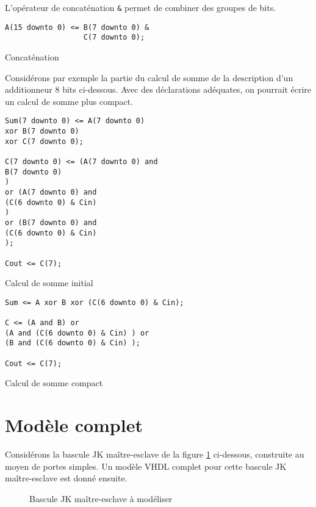 \documentclass[letter, oneside]{book}
\begin{document}
L'opérateur de concaténation \texttt{\&} permet de combiner des groupes de bits.

\begin{listing}[htbp]
\begin{verbatim}
A(15 downto 0) <= B(7 downto 0) &
                  C(7 downto 0);
\end{verbatim}
\caption{Concaténation}
\end{listing}

Considérons par exemple la partie du calcul de somme de la description
d'un additionneur 8 bits ci-dessous.  Avec des déclarations adéquates,
on pourrait écrire un calcul de somme plus compact.

\begin{listing}[htbp]
\begin{verbatim}
Sum(7 downto 0) <= A(7 downto 0)
xor B(7 downto 0)
xor C(7 downto 0);

C(7 downto 0) <= (A(7 downto 0) and
B(7 downto 0)
)
or (A(7 downto 0) and
(C(6 downto 0) & Cin)
)
or (B(7 downto 0) and
(C(6 downto 0) & Cin)
);

Cout <= C(7);
\end{verbatim}
\caption{Calcul de somme initial}
\end{listing}



\begin{listing}[htbp]
\begin{verbatim}
Sum <= A xor B xor (C(6 downto 0) & Cin);

C <= (A and B) or
(A and (C(6 downto 0) & Cin) ) or
(B and (C(6 downto 0) & Cin) );

Cout <= C(7);
\end{verbatim}
\caption{Calcul de somme compact}
\end{listing}

\section{Modèle complet}
\label{sec:org3f07cb7}

Considérons la bascule JK maître-esclave de la figure \ref{fig:org2322e34}
ci-dessous, construite au moyen de portes simples.  Un modèle
VHDL complet pour cette bascule JK maître-esclave est donné ensuite.

\begin{figure}[htbp]
\centering

\caption{\label{fig:org2322e34}Bascule JK maître-esclave à modéliser}
\end{figure}
\end{document}
